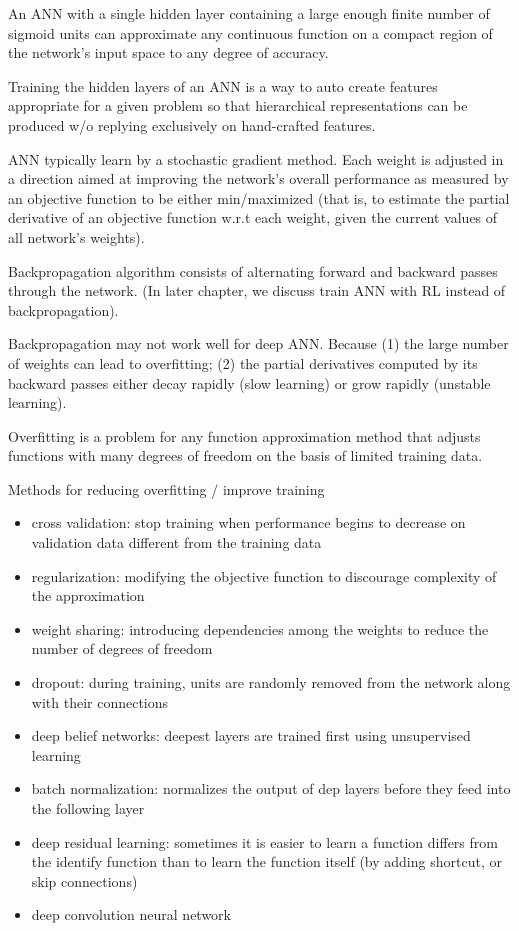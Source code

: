 \documentclass[sutton_barto_notes.tex]{subfiles}
\begin{document}
An ANN with a single hidden layer containing a large enough finite number of sigmoid units can approximate any continuous function on a compact region of the network's input space to any degree of accuracy.

Training the hidden layers of an ANN is a way to auto create features appropriate for a given problem so that hierarchical representations can be produced w/o replying exclusively on hand-crafted features.

ANN typically learn by a stochastic gradient method. Each weight is adjusted in a direction aimed at improving the network's overall performance as measured by an objective function to be either min/maximized (that is, to estimate the partial derivative of an objective function w.r.t each weight, given the current values of all network's weights).

Backpropagation algorithm consists of alternating forward and backward passes through the network. (In later chapter, we discuss train ANN with RL instead of backpropagation).

Backpropagation may not work well for deep ANN. Because (1) the large number of weights can lead to overfitting; (2) the partial derivatives computed by its backward passes either decay rapidly (slow learning) or grow rapidly (unstable learning).

Overfitting is a problem for any function approximation method that adjusts functions with many degrees of freedom on the basis of limited training data.

Methods for reducing overfitting / improve training
\begin{itemize}
\item cross validation: stop training when performance begins to decrease on validation data different from the training data
\item regularization: modifying the objective function to discourage complexity of the approximation
\item weight sharing: introducing dependencies among the weights to reduce the number of degrees of freedom
\item dropout: during training, units are randomly removed from the network along with their connections
\item deep belief networks: deepest layers are trained first using unsupervised learning
\item batch normalization: normalizes the output of dep layers before they feed into the following layer
\item deep residual learning: sometimes it is easier to learn a function differs from the identify function than to learn the function itself (by adding shortcut, or skip connections)
\item deep convolution neural network
\end{itemize}
\end{document}
